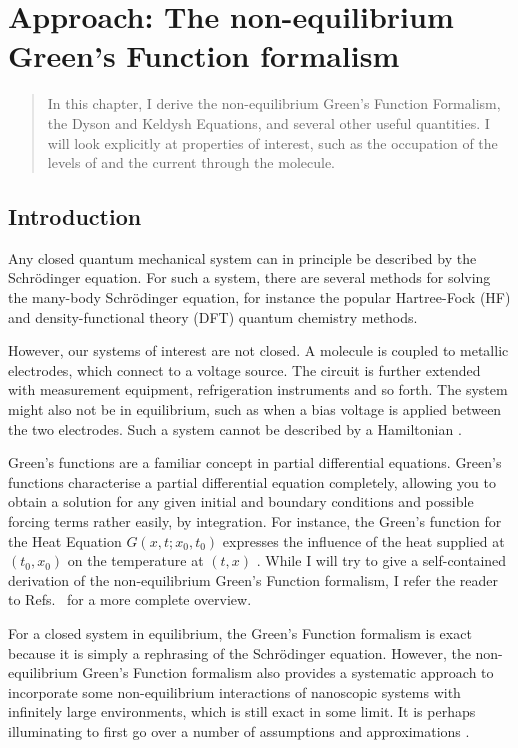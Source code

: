 \chapter{Approach: The non-equilibrium Green's Function formalism}
\label{ch:chapter_2}

\begin{abstract}
In this chapter, I derive the non-equilibrium Green's Function Formalism, the Dyson and Keldysh Equations, and several other useful quantities. I will look explicitly at properties of interest, such as the occupation of the levels of and the current through the molecule.
\end{abstract}

\newpage
\section{Introduction}
Any closed quantum mechanical system can in principle be described by the Schr\"o\-dinger equation. For such a system, there are several methods for solving the many-body Schr\"o\-dinger equation, for instance the popular Hartree-Fock (HF) and density-functional theory (DFT) quantum chemistry methods.

However, our systems of interest are not closed. A molecule is coupled to metallic electrodes, which connect to a voltage source. The circuit is further extended with measurement equipment, refrigeration instruments and so forth. The system might also not be in equilibrium, such as when a bias voltage is applied between the two electrodes. Such a system cannot be described by a Hamiltonian \cite{seldenthuis}.

Green's functions are a familiar concept in partial differential equations. Green's functions characterise a partial differential equation completely, allowing you to obtain a solution for any given initial and boundary conditions and possible forcing terms rather easily, by integration. For instance, the Green's function for the Heat Equation $G(x,t; x_0, t_0)$ expresses the influence of the heat supplied at $(t_0, x_0)$ on the temperature at $(t,x)$ \cite{haberman}. 
While I will try to give a self-contained derivation of the non-equilibrium Green's Function formalism, I refer the reader to Refs.~\cite{mattuck,diventra,haugjauho, leeuwen} for a more complete overview.

For a closed system in equilibrium, the Green's Function formalism is exact because it is simply a rephrasing of the Schr\"odinger equation. However, the non-equilibrium Green's Function formalism also provides a systematic approach to incorporate some non-equilibrium interactions of nanoscopic systems with infinitely large environments, which is still exact in some limit. It is perhaps illuminating to first go over a number of assumptions and approximations \cite{seldenthuis}. 

